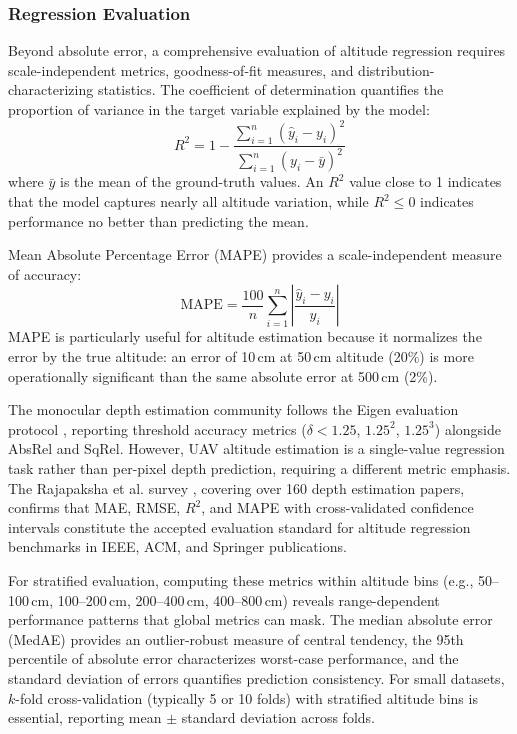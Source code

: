    \subsubsection{Regression Evaluation}

    Beyond absolute error, a comprehensive evaluation of altitude regression requires scale-independent metrics, goodness-of-fit measures, and distribution-characterizing statistics. The coefficient of determination quantifies the proportion of variance in the target variable explained by the model:
    \begin{equation}
        R^2 = 1 - \frac{\sum_{i=1}^{n}(\hat{y}_i - y_i)^2}{\sum_{i=1}^{n}(y_i - \bar{y})^2}
        \label{eq:r2}
    \end{equation}
    where $\bar{y}$ is the mean of the ground-truth values. An $R^2$ value close to 1 indicates that the model captures nearly all altitude variation, while $R^2 \leq 0$ indicates performance no better than predicting the mean.

    Mean Absolute Percentage Error (MAPE) provides a scale-independent measure of accuracy:
    \begin{equation}
        \mathrm{MAPE} = \frac{100}{n} \sum_{i=1}^{n} \left|\frac{\hat{y}_i - y_i}{y_i}\right|
        \label{eq:mape}
    \end{equation}
    MAPE is particularly useful for altitude estimation because it normalizes the error by the true altitude: an error of 10\,cm at 50\,cm altitude (20\%) is more operationally significant than the same absolute error at 500\,cm (2\%).

    The monocular depth estimation community follows the Eigen evaluation protocol \cite{Eigen2014}, reporting threshold accuracy metrics ($\delta < 1.25$, $1.25^2$, $1.25^3$) alongside AbsRel and SqRel. However, UAV altitude estimation is a single-value regression task rather than per-pixel depth prediction, requiring a different metric emphasis. The Rajapaksha et al. survey \cite{Rajapaksha2024}, covering over 160 depth estimation papers, confirms that MAE, RMSE, $R^2$, and MAPE with cross-validated confidence intervals constitute the accepted evaluation standard for altitude regression benchmarks in IEEE, ACM, and Springer publications.

    For stratified evaluation, computing these metrics within altitude bins (e.g., 50--100\,cm, 100--200\,cm, 200--400\,cm, 400--800\,cm) reveals range-dependent performance patterns that global metrics can mask. The median absolute error (MedAE) provides an outlier-robust measure of central tendency, the 95th percentile of absolute error characterizes worst-case performance, and the standard deviation of errors quantifies prediction consistency. For small datasets, $k$-fold cross-validation (typically 5 or 10 folds) with stratified altitude bins is essential, reporting mean $\pm$ standard deviation across folds.

